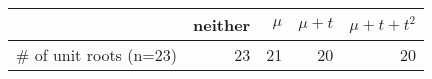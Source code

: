 \begin{tabular}{lrrrr}
\toprule
{} &  neither &  $\mu$ &  $\mu + t$ &  $\mu + t + t^2$ \\
\midrule
\# of unit roots (n=23) &       23 &     21 &         20 &               20 \\
\bottomrule
\end{tabular}
